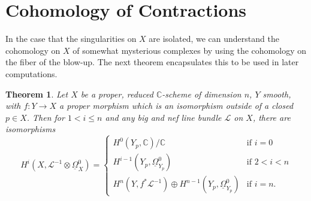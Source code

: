\documentclass{report}
\newtheorem{theorem}{Theorem}[section]
\theoremstyle{definition}
\newcommand{\CC}{\mathbb{C}}
\newcommand{\LL}{\mathcal{L}}
\newcommand{\DB}{\underline{\Omega}}
\begin{document}
\section{Cohomology of Contractions}
In the case that the singularities on $X$ are isolated, we can understand the cohomology on $X$ of somewhat mysterious complexes by using the cohomology on the fiber of the blow-up.
The next theorem encapsulates this to be used in later computations.
\begin{theorem}
	\label{thm:isosingcalc}
	Let $X$ be a proper, reduced $\CC$-scheme of dimension $n$, $Y$ smooth, with $f:Y \rightarrow X$ a proper morphism which is an isomorphism outside of a closed $p \in X$. Then for $1 < i \leq n$ and any big and nef line bundle $\LL$ on $X$, there are isomorphisms
	\[
		H^i(X, \LL^{-1} \otimes \DB_X^0) = \begin{cases} H^0(Y_p, \CC)/\CC & \text{if } i = 0 \\
		H^{i-1}(Y_p, \DB_{Y_p}^0) & \text{if } 2 < i < n \\
		H^n(Y, f^* \LL^{-1}) \oplus H^{n-1}(Y_p, \DB_{Y_p}^0) & \text{if } i = n.
		\end{cases}
	\]
\end{theorem}
\end{document}
